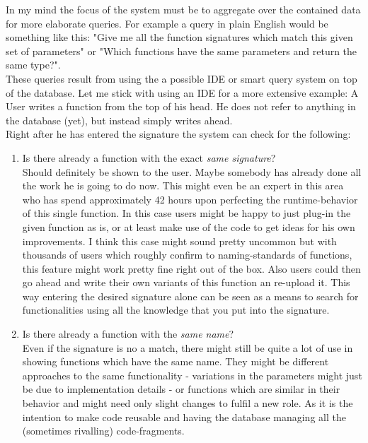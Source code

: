 \documentclass[11p]{scrartcl}
\begin{document}
In my mind the focus of the system must be to aggregate over the contained data for more elaborate queries. For example a query in plain English would be something like this: "Give me all the function signatures which match this given set of parameters" or "Which functions have the same parameters and return the same type?".\\
These queries result from using the a possible IDE or smart query system on top of the database. Let me stick with using an IDE for a more extensive example: A User writes a function from the top of his head. He does not refer to anything in the database (yet), but instead simply writes ahead. \\
Right after he has entered the signature the system can check for the following: 
\begin{enumerate}
	\item Is there already a function with the exact \emph{same signature}?\\
Should definitely be shown to the user. Maybe somebody has already done all the work he is going to do now. This might even be an expert in this area who has spend approximately 42 hours upon perfecting the runtime-behavior of this single function. In this case users might be happy to just plug-in the given function as is, or at least make use of the code to get ideas for his own improvements. I think this case might sound pretty uncommon but with thousands of users which roughly confirm to naming-standards of functions, this feature might work pretty fine right out of the box. Also users could then go ahead and write their own variants of this function an re-upload it. This way entering the desired signature alone can be seen as a means to search for functionalities using all the knowledge that you put into the signature.

	\item Is there already a function with the \emph{same name}?\\
Even if the signature is no a match, there might still be quite a lot of use in showing functions which have the same name. They might be different approaches to the same functionality - variations in the parameters might just be due to implementation details - or functions which are similar in their behavior and might need only slight changes to fulfil a new role. As it is the intention to make code reusable and having the database managing all the (sometimes rivalling) code-fragments.


\end{enumerate}
\end{document}
